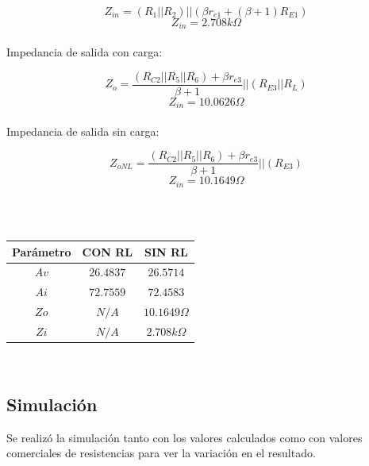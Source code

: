\documentclass[conference]{IEEEtran}
\begin{document}
\[ Z_{in} = (R_{1}||R_{2}) || (\beta r_{e1}+(\beta + 1)R_{E1}) \]
\[ \boxed{ Z_{in} = 2.708k\Omega} \]\\ 

Impedancia de salida con carga:

\[ Z_{o} = \frac{(R_{C2}||R_{5}||R_{6}) + \beta r_{e3}}{\beta + 1} || (R_{E3}||R_{L})\]
\[ \boxed{ Z_{in} = 10.0626\Omega} \]\\ 

Impedancia de salida sin carga:

\[ Z_{oNL} = \frac{(R_{C2}||R_{5}||R_{6}) + \beta r_{e3}}{\beta + 1} || (R_{E3})\]
\[ \boxed{ Z_{in} = 10.1649\Omega} \]\\ 
\begin{center}
\hspace{1cm}\\
\begin{tabular}{|c c c|}
		\hline
		Parámetro & CON RL & SIN RL \\ [1ex]
		\hline\hline
		$Av$ & $26.4837$ & $26.5714$ \\
        $Ai$ & $72.7559$ & $72.4583$ \\
        $Zo$ & $N/A$ & $10.1649\Omega$ \\
        $Zi$ & $N/A$ & $2.708k\Omega$ \\
		\hline
\end{tabular}
\hspace{1cm}\\    
\end{center}


\subsection{Simulación}
Se realizó la simulación tanto con los valores calculados como con valores comerciales de resistencias para ver la variación en el resultado.
\end{document}
